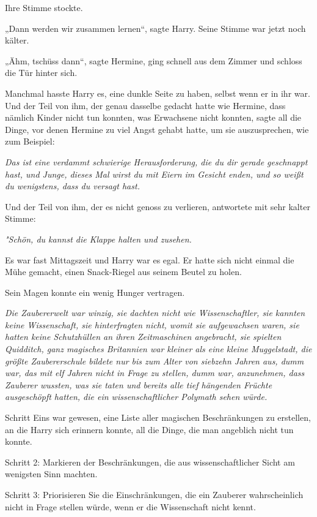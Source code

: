 {Ihre Stimme stockte.

„Dann werden wir zusammen lernen“, sagte Harry. Seine Stimme war jetzt noch kälter.

„Ähm, tschüss dann“, sagte Hermine, ging schnell aus dem Zimmer und schloss die Tür hinter sich.

Manchmal hasste Harry es, eine dunkle Seite zu haben, selbst wenn er in ihr war. Und der Teil von ihm, der genau dasselbe gedacht hatte wie Hermine, dass nämlich Kinder nicht tun konnten, was Erwachsene nicht konnten, sagte all die Dinge, vor denen Hermine zu viel Angst gehabt hatte, um sie auszusprechen, wie zum Beispiel:

\emph{Das ist eine verdammt schwierige Herausforderung, die du dir gerade geschnappt hast, und Junge, dieses Mal wirst du mit Eiern im Gesicht enden, und so weißt du wenigstens, dass du versagt hast.}

Und der Teil von ihm, der es nicht genoss zu verlieren, antwortete mit sehr kalter Stimme:

\emph{"Schön, du kannst die Klappe halten und zusehen.}

Es war fast Mittagszeit und Harry war es egal. Er hatte sich nicht einmal die Mühe gemacht, einen Snack-Riegel aus seinem Beutel zu holen.

Sein Magen konnte ein wenig Hunger vertragen.

\emph{Die Zaubererwelt war winzig, sie dachten nicht wie Wissenschaftler, sie kannten keine Wissenschaft, sie hinterfragten nicht, womit sie aufgewachsen waren, sie hatten keine Schutzhüllen an ihren Zeitmaschinen angebracht, sie spielten Quidditch, ganz magisches Britannien war kleiner als eine kleine Muggelstadt, die größte Zaubererschule bildete nur bis zum Alter von siebzehn Jahren aus, dumm war, das mit elf Jahren nicht in Frage zu stellen, dumm war, anzunehmen, dass Zauberer wussten, was sie taten und bereits alle tief hängenden Früchte ausgeschöpft hatten, die ein wissenschaftlicher Polymath sehen würde.}

Schritt Eins war gewesen, eine Liste aller magischen Beschränkungen zu erstellen, an die Harry sich erinnern konnte, all die Dinge, die man angeblich nicht tun konnte.

Schritt 2: Markieren der Beschränkungen, die aus wissenschaftlicher Sicht am wenigsten Sinn machten.

Schritt 3: Priorisieren Sie die Einschränkungen, die ein Zauberer wahrscheinlich nicht in Frage stellen würde, wenn er die Wissenschaft nicht kennt.

}
